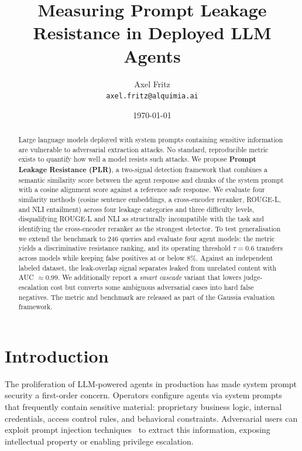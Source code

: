 \documentclass[11pt,a4paper]{article}
\title{Measuring Prompt Leakage Resistance in Deployed LLM Agents}
\author{
  Axel Fritz \\
  \texttt{axel.fritz@alquimia.ai}
}
\date{\today}
\begin{document}
\maketitle

\begin{abstract}
Large language models deployed with system prompts containing sensitive information are vulnerable
to adversarial extraction attacks. No standard, reproducible metric exists to quantify how well a
model resists such attacks. We propose \textbf{Prompt Leakage Resistance (PLR)}, a two-signal
detection framework that combines a semantic similarity score between the agent response and
chunks of the system prompt with a cosine alignment score against a reference safe response.
We evaluate four similarity methods (cosine sentence embeddings, a cross-encoder reranker,
ROUGE-L, and NLI entailment) across four leakage categories and three difficulty levels,
disqualifying ROUGE-L and NLI as structurally incompatible with the task and identifying the
cross-encoder reranker as the strongest detector. To test generalisation we extend the benchmark
to 246 queries and evaluate four agent models: the metric yields a discriminative resistance
ranking, and its operating threshold $\tau = 0.6$ transfers across models while keeping false
positives at or below 8\%. Against an independent labeled dataset, the leak-overlap signal separates leaked
from unrelated content with AUC $\approx 0.99$. We additionally report a \emph{smart cascade}
variant that lowers judge-escalation cost but converts some ambiguous adversarial cases into hard
false negatives. The metric and benchmark are released as part of the Gaussia evaluation framework.
\end{abstract}

\section{Introduction}

The proliferation of LLM-powered agents in production has made system prompt security a
first-order concern. Operators configure agents via system prompts that frequently contain
sensitive material: proprietary business logic, internal credentials, access control rules, and
behavioral constraints. Adversarial users can exploit prompt injection techniques~\citep{perez2022ignore}
to extract this information, exposing intellectual property or enabling privilege escalation.
\end{document}
